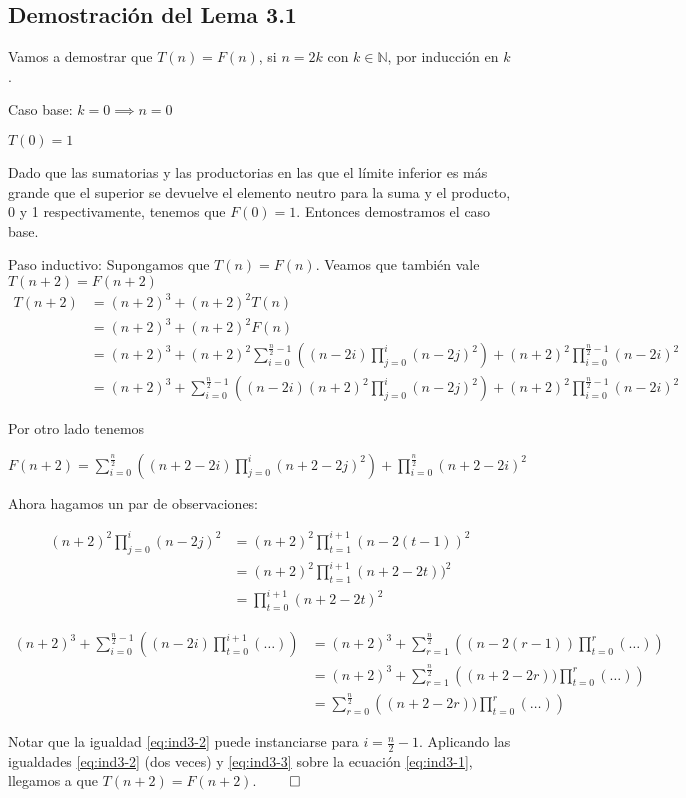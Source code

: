 \subsection{Demostración del Lema 3.1}

Vamos a demostrar que $T(n) = F(n)$, si $n=2k$ con $k\in\mathbb{N}$, por inducción en $k$.

Caso base: $k=0 \implies n=0$

  $T(0) = 1$ 

  Dado que las sumatorias y las productorias en las que el límite inferior es más grande que el superior se devuelve el elemento neutro para la suma y el producto, 0 y 1 respectivamente, tenemos que $F(0) = 1$. Entonces demostramos el caso base.

Paso inductivo: Supongamos que $T(n) = F(n)$. Veamos que también vale $T(n + 2) = F(n + 2)$ \\
  \begin{equation}
  \label{eq:ind3-1}
  \begin{aligned}
  T(n+2) &= (n+2)^3 + (n+2)^2 T(n) \\
         &= (n+2)^3 + (n+2)^2 F(n) \\
         &= (n+2)^3 + (n+2)^2 \sum_{i=0}^{\frac{n}{2}-1} \left((n-2i) \prod_{j=0}^{i}(n-2j)^2\right) + (n+2)^2 \prod_{i=0}^{\frac{n}{2}-1}(n-2i)^2\\
         &= (n+2)^3 + \sum_{i=0}^{\frac{n}{2}-1} \left((n-2i) (n+2)^2 \prod_{j=0}^{i}(n-2j)^2\right) + (n+2)^2 \prod_{i=0}^{\frac{n}{2}-1}(n-2i)^2
  \end{aligned}
  \end{equation}

  Por otro lado tenemos

  $F(n+2) = \sum_{i=0}^{\frac{n}{2}} \left((n+2-2i) \prod_{j=0}^{i}(n+2-2j)^2\right) + \prod_{i=0}^{\frac{n}{2}}(n+2-2i)^2$

  Ahora hagamos un par de observaciones:

  \begin{equation}
  \label{eq:ind3-2}
  \begin{aligned}
  (n+2)^2 \prod_{j=0}^{i}(n-2j)^2
  &= (n+2)^2 \prod_{t=1}^{i+1}(n-2(t-1))^2\\
  &= (n+2)^2 \prod_{t=1}^{i+1}(n+2-2t))^2\\
  &= \prod_{t=0}^{i+1}(n+2-2t)^2 
  \end{aligned}
  \end{equation}

  \begin{equation}
  \label{eq:ind3-3}
  \begin{aligned}
  (n+2)^3 + \sum_{i=0}^{\frac{n}{2}-1} \left((n-2i) \prod_{t=0}^{i+1}(\hdots)\right)
  &= (n+2)^3 + \sum_{r=1}^{\frac{n}{2}} \left((n-2(r-1)) \prod_{t=0}^{r}(\hdots)\right) \\
  &= (n+2)^3 + \sum_{r=1}^{\frac{n}{2}} \left((n+2-2r)) \prod_{t=0}^{r}(\hdots)\right) \\
  &= \sum_{r=0}^{\frac{n}{2}} \left((n+2-2r)) \prod_{t=0}^{r}(\hdots)\right)
  \end{aligned}
  \end{equation}

  Notar que la igualdad \ref{eq:ind3-2} puede instanciarse para $i = \frac{n}{2}-1$. 
  Aplicando las igualdades \ref{eq:ind3-2} (dos veces) y \ref{eq:ind3-3} sobre la ecuación \ref{eq:ind3-1}, llegamos a que $T(n + 2) = F(n + 2)$. $\qed$
